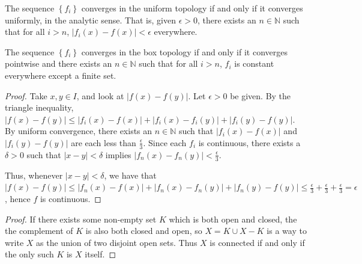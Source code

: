 The sequence $\left\{f_i\right\}$ converges in the uniform topology if and only if it converges uniformly, in the analytic sense.  That is, given $\epsilon>0$, there exists an $n\in\mathbb{N}$ such that for all $i>n$, $|f_i(x)-f(x)|< \epsilon$ everywhere.

The sequence $\left\{f_i\right\}$ converges in the box topology if and only if it converges pointwise and there exists an $n\in \mathbb{N}$ such that for all $i>n$, $f_i$ is constant everywhere except a finite set.



\begin{proof}
	
	Take $x,y\in I$, and look at $|f(x)-f(y)|$.  Let $\epsilon>0$ be given.  By the triangle inequality, $|f(x)-f(y)| \leq |f_i(x)-f(x)| + |f_i(x)-f_i(y)|+|f_i(y)-f(y)|$.  By uniform convergence, there exists an $n\in\mathbb{N}$ such that $|f_i(x) - f(x)|$ and $|f_i(y)-f(y)|$ are each less than $\frac{\epsilon}{3}$.  Since each $f_i$ is continuous, there exists a $\delta >0$ such that $|x-y| < \delta$ implies $|f_n(x)-f_n(y)|<\frac{\epsilon}{3}$.  
	
	Thus, whenever $|x-y|<\delta$, we have that $|f(x)-f(y)| \leq |f_n(x)-f(x)| + |f_n(x)-f_n(y)|+|f_n(y)-f(y)| \leq \frac{\epsilon}{3} +\frac{\epsilon}{3} +\frac{\epsilon}{3} = \epsilon$, hence $f$ is continuous.
	
	\end{proof}
	
	
	





\begin{proof}
	
	If there exists some non-empty set $K$ which is both open and closed, the the complement of $K$ is also both closed and open, so $X=K\cup X-K$ is a way to write $X$ as the union of two disjoint open sets.  Thus $X$ is connected if and only if the only such $K$ is $X$ itself.
	
	
	\end{proof}



